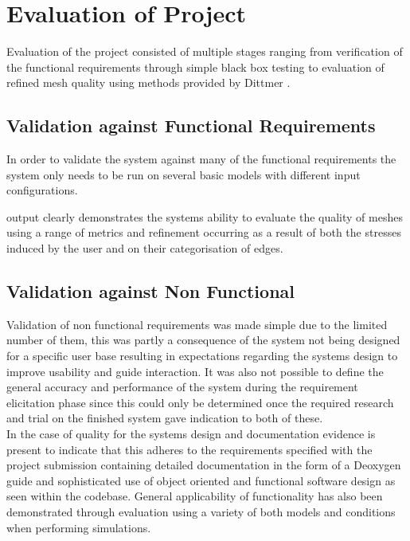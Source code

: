 
\section{Evaluation of Project}
Evaluation of the project consisted of multiple stages ranging from verification of the functional requirements through simple black box testing to evaluation of refined mesh quality using methods provided by Dittmer \cite{DittmerMeshQualityMet}. 

\subsection{Validation against Functional Requirements}
In order to validate the system against many of the functional requirements the system only needs to be run on several basic models with different input configurations. 

output clearly demonstrates the systems ability to evaluate the quality of meshes using a range of metrics and refinement occurring as a result of both the stresses induced by the user and on their categorisation of edges. 


\subsection{Validation against Non Functional}
Validation of non functional requirements was made simple due to the limited number of them, this was partly a consequence of the system not being designed for a specific user base resulting in expectations regarding the systems design to improve usability and guide interaction. It was also not possible to define the general accuracy and performance of the system during the requirement elicitation phase since this could only be determined once the required research and trial on the finished system gave indication to both of these. \\

\noindent
In the case of quality for the systems design and documentation evidence is present to indicate that this adheres to the requirements specified with the project submission containing detailed documentation in the form of a Deoxygen guide and sophisticated use of object oriented and functional software design as seen within the codebase. General applicability of functionality has also been demonstrated through evaluation using a variety of both models and conditions when performing simulations.


